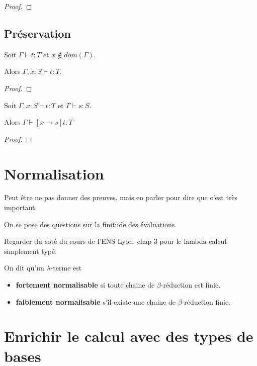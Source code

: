 \begin{proof}
  
\end{proof}

\subsection*{Préservation}

\begin{lemma} [d'affaiblissement]
  Soit $\Gamma \vdash t : T$ et $x \notin dom(\Gamma)$.

  Alors $\Gamma, x : S \vdash t : T$.
\end{lemma}

\begin{proof}
  
\end{proof}

\begin{lemma} 
  Soit $\Gamma, x : S \vdash t : T$ et $\Gamma \vdash s : S$.

  Alors $\Gamma \vdash [x \rightarrow s] t : T$
\end{lemma}

\begin{proof}

\end{proof}

\section*{Normalisation}

Peut être ne pas donner des preuves, mais en parler pour dire que c'est très important.

On se pose des questions sur la finitude des évaluations.

Regarder du coté du cours de l'ENS Lyon, chap 3 pour le lambda-calcul simplement typé.

\begin{definition}
  On dit qu'un $\lambda$-terme est
  \begin{itemize}
  \item \textbf{fortement normalisable} si
  toute chaine de $\beta$-réduction est finie.
  \item \textbf{faiblement normalisable} s'il existe une chaine de
    $\beta$-réduction finie.
  \end{itemize}
\end{definition}

\section{Enrichir le calcul avec des types de bases}

